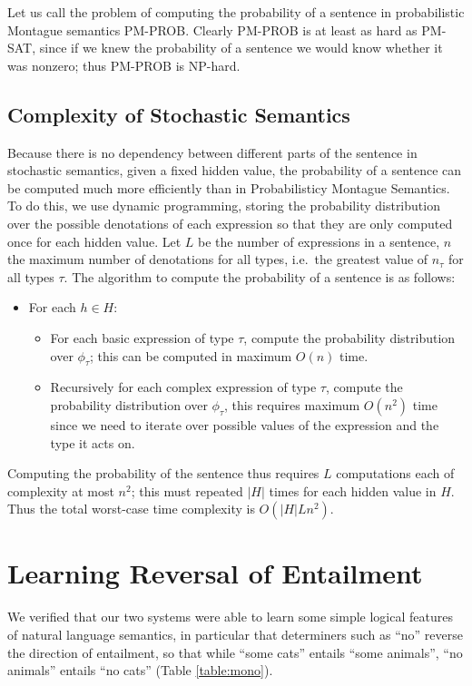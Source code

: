 \documentclass[11pt]{article}
\theoremstyle{definition}
\begin{document}
Let us call the problem of computing the probability of a sentence in
probabilistic Montague semantics PM-PROB. Clearly PM-PROB is at least
as hard as PM-SAT, since if we knew the probability of a sentence we
would know whether it was nonzero; thus PM-PROB is NP-hard.

\subsection{Complexity of Stochastic Semantics}

Because there is no dependency between different parts of the sentence
in stochastic semantics, given a fixed hidden value, the probability
of a sentence can be computed much more efficiently than in
Probabilisticy Montague Semantics. To do this, we use dynamic
programming, storing the probability distribution over the possible
denotations of each expression so that they are only computed once for
each hidden value. Let $L$ be the number of expressions in a sentence,
$n$ the maximum number of denotations for all types, i.e.~the greatest
value of $n_\tau$ for all types $\tau$. The algorithm to compute the
probability of a sentence is as follows:
\begin{itemize}
\item For each $h\in H$:
\begin{itemize}
\item For each basic expression of type $\tau$, compute the
  probability distribution over $\phi_\tau$; this can be computed in
  maximum $O(n)$ time.
\item Recursively for each complex expression of type $\tau$, compute
  the probability distribution over $\phi_\tau$, this requires maximum
  $O(n^2)$ time since we need to iterate over possible values of the
  expression and the type it acts on.
\end{itemize}
\end{itemize}
Computing the probability of the sentence thus requires $L$
computations each of complexity at most $n^2$; this must repeated
$|H|$ times for each hidden value in $H$. Thus the total worst-case
time complexity is $O(|H|Ln^2)$.



\section{Learning Reversal of Entailment}

We verified that our two systems were able to learn some simple
logical features of natural language semantics, in particular that
determiners such as ``no'' reverse the direction of entailment, so
that while ``some cats'' entails ``some animals'', ``no animals''
entails ``no cats'' (Table \ref{table:mono}).
\end{document}
